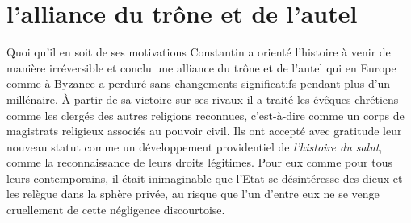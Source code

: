 \section{l'alliance du trône et de l'autel}
Quoi qu'il en soit de ses motivations Constantin a orienté l'histoire à venir de manière irréversible et conclu une alliance du trône et de l'autel qui en Europe comme à Byzance a perduré sans changements significatifs pendant plus d'un millénaire. À partir de sa victoire sur ses rivaux il a traité les évêques chrétiens comme les clergés des autres religions reconnues, c'est-à-dire comme un corps de magistrats religieux associés au pouvoir civil. Ils ont accepté avec gratitude leur nouveau statut comme un développement providentiel de \emph{l'histoire du salut}, comme la reconnaissance de leurs droits légitimes. Pour eux comme pour tous leurs contemporains, il était inimaginable que l'Etat se désintéresse des dieux et les relègue dans la sphère privée, au risque que l'un d'entre eux ne se venge cruellement de cette négligence discourtoise. 
 

